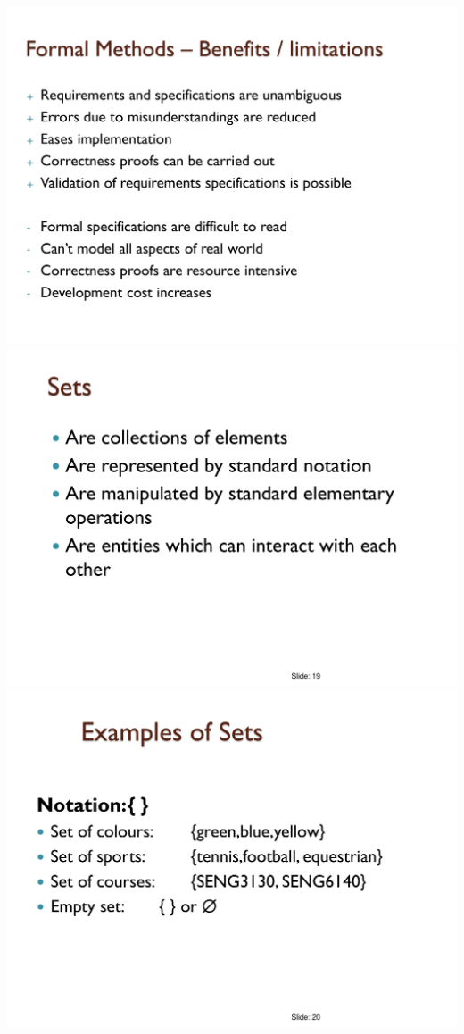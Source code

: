 \documentclass[a4paper]{article}
\begin{document}
\begin{multicols}{3}
        \includegraphics[width=\linewidth]{449.pdf}\\
        \includegraphics[width=\linewidth]{451.pdf}\\
        \includegraphics[width=\linewidth]{452.pdf}\\

\end{multicols}
\end{document}
